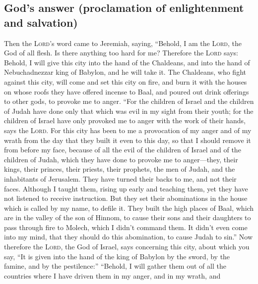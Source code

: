 \hypertarget{gods-answer-proclamation-of-enlightenment-and-salvation}{%
\subsection{God's answer (proclamation of enlightenment and
salvation)}\label{gods-answer-proclamation-of-enlightenment-and-salvation}}

 Then the \textsc{Lord}'s word came to Jeremiah, saying,
 ``Behold, I am the \textsc{Lord}, the God of all flesh.
Is there anything too hard for me?  Therefore the
\textsc{Lord} says: Behold, I will give this city into the hand of the
Chaldeans, and into the hand of Nebuchadnezzar king of Babylon, and he
will take it.  The Chaldeans, who fight against this
city, will come and set this city on fire, and burn it with the houses
on whose roofs they have offered incense to Baal, and poured out drink
offerings to other gods, to provoke me to anger.  ``For
the children of Israel and the children of Judah have done only that
which was evil in my sight from their youth; for the children of Israel
have only provoked me to anger with the work of their hands, says the
\textsc{Lord}.  For this city has been to me a
provocation of my anger and of my wrath from the day that they built it
even to this day, so that I should remove it from before my face,
 because of all the evil of the children of Israel and of
the children of Judah, which they have done to provoke me to
anger---they, their kings, their princes, their priests, their prophets,
the men of Judah, and the inhabitants of Jerusalem.  They
have turned their backs to me, and not their faces. Although I taught
them, rising up early and teaching them, yet they have not listened to
receive instruction.  But they set their abominations in
the house which is called by my name, to defile it.  They
built the high places of Baal, which are in the valley of the son of
Hinnom, to cause their sons and their daughters to pass through fire to
Molech, which I didn't command them. It didn't even come into my mind,
that they should do this abomination, to cause Judah to sin.''
 Now therefore the \textsc{Lord}, the God of Israel, says
concerning this city, about which you say, ``It is given into the hand
of the king of Babylon by the sword, by the famine, and by the
pestilence:''  ``Behold, I will gather them out of all
the countries where I have driven them in my anger, and in my wrath, and
